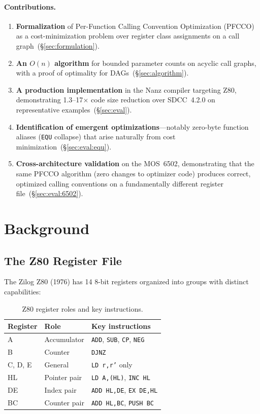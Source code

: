 \documentclass[sigplan,screen,nonacm]{acmart}
\begin{document}
\paragraph{Contributions.}
\begin{enumerate}
\item \textbf{Formalization} of Per-Function Calling Convention Optimization
  (PFCCO) as a cost-minimization problem over register class assignments on
  a call graph~(\S\ref{sec:formulation}).
\item \textbf{An $O(n)$ algorithm} for bounded parameter counts on acyclic
  call graphs, with a proof of optimality for
  DAGs~(\S\ref{sec:algorithm}).
\item \textbf{A production implementation} in the Nanz compiler targeting
  Z80, demonstrating 1.3--17$\times$ code size reduction over SDCC~4.2.0 on
  representative examples~(\S\ref{sec:eval}).
\item \textbf{Identification of emergent optimizations}---notably zero-byte
  function aliases (\texttt{EQU} collapse) that arise naturally from cost
  minimization~(\S\ref{sec:eval:equ}).
\item \textbf{Cross-architecture validation} on the MOS~6502, demonstrating
  that the same PFCCO algorithm (zero changes to optimizer code) produces
  correct, optimized calling conventions on a fundamentally different register
  file~(\S\ref{sec:eval:6502}).
\end{enumerate}

\section{Background}
\label{sec:background}

\subsection{The Z80 Register File}

The Zilog Z80 (1976) has 14 8-bit registers organized into groups with
distinct capabilities:

\begin{table}[h]
\centering\small
\caption{Z80 register roles and key instructions.}
\label{tab:z80regs}
\begin{tabular}{@{}lll@{}}
\toprule
Register & Role & Key instructions \\
\midrule
A        & Accumulator   & \texttt{ADD}, \texttt{SUB}, \texttt{CP}, \texttt{NEG} \\
B        & Counter       & \texttt{DJNZ} \\
C, D, E  & General       & \texttt{LD r,r'} only \\
HL       & Pointer pair  & \texttt{LD A,(HL)}, \texttt{INC HL} \\
DE       & Index pair    & \texttt{ADD HL,DE}, \texttt{EX DE,HL} \\
BC       & Counter pair  & \texttt{ADD HL,BC}, \texttt{PUSH BC} \\
\bottomrule
\end{tabular}
\end{table}
\end{document}
